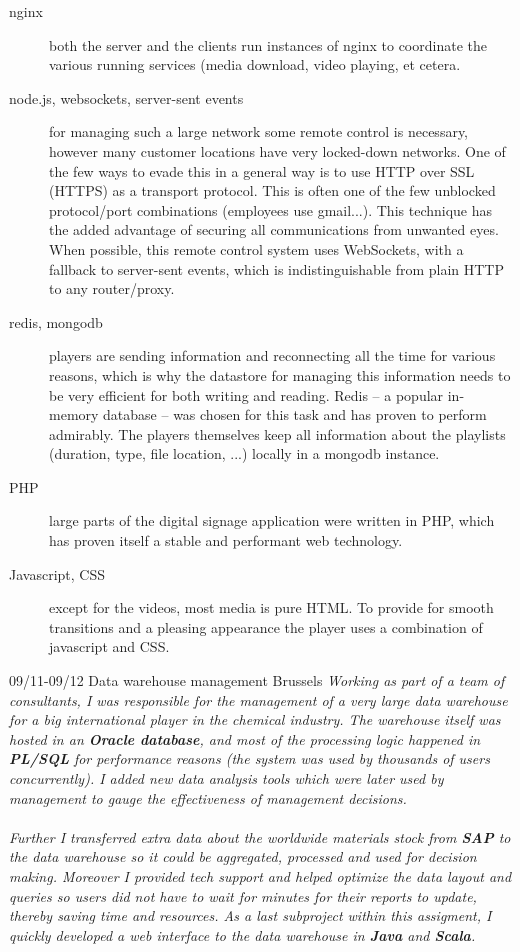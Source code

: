 \documentclass[]{friggeri-cv}
\begin{document}
\begin{entrylist}
{{\begin{description}
        \item[nginx] both the server and the clients run instances of nginx to coordinate the various running services (media download, video playing, et cetera.
        \item[node.js, websockets, server-sent events] for managing such a large network some remote control is necessary, however many customer locations have very locked-down networks. One of the few ways to evade this in a general way is to use HTTP over SSL (HTTPS) as a transport protocol. This is often one of the few unblocked protocol/port combinations (employees use gmail...). This technique has the added advantage of securing all communications from unwanted eyes. When possible, this remote control system uses WebSockets, with a fallback to server-sent events, which is indistinguishable from plain HTTP to any router/proxy.
        \item[redis, mongodb] players are sending information and reconnecting all the time for various reasons, which is why the datastore for managing this information needs to be very efficient for both writing and reading. Redis -- a popular in-memory database -- was chosen for this task and has proven to perform admirably. The players themselves keep all information about the playlists (duration, type, file location, ...) locally in a mongodb instance.
        \item[PHP] large parts of the digital signage application were written in PHP, which has proven itself a stable and performant web technology.
        \item[Javascript, CSS] except for the videos, most media is pure HTML. To provide for smooth transitions and a pleasing appearance the player uses a combination of javascript and CSS.
    \end{description}
    }}
\end{entrylist}

\begin{entrylist}
  \entry
    {09/11-09/12}
    {Data warehouse management}
    {Brussels}
    {\emph{
    Working as part of a team of consultants, I was responsible for the management of a very large data warehouse for a big international player in the chemical industry. The warehouse itself was hosted in an \textbf{Oracle database}, and most of the processing logic happened in \textbf{PL/SQL} for performance reasons (the system was used by thousands of users concurrently). I added new data analysis tools which were later used by management to gauge the effectiveness of management decisions. \\\\ Further I transferred extra data about the worldwide materials stock from \textbf{SAP} to the data warehouse so it could be aggregated, processed and used for decision making. Moreover I provided tech support and helped optimize the data layout and queries so users did not have to wait for minutes for their reports to update, thereby saving time and resources. As a last subproject within this assigment, I quickly developed a web interface to the data warehouse in \textbf{Java} and \textbf{Scala}.
    }}
\end{entrylist}
\end{document}
